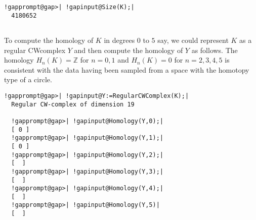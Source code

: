 \documentclass[a4paper,11pt]{report}
\begin{document}
{{\begin{Verbatim}[commandchars=!@|,fontsize=\small,frame=single,label=Example]
  !gapprompt@gap>| !gapinput@Size(K);|
  4180652
  
\end{Verbatim}
 

To compute the homology of $K$ in degrees $0$ to $5$ say, we could represent $K$ as a regular CW\texttt{}complex $Y$ and then compute the homology of $Y$ as follows. The homology $H_n(K)=\mathbb Z$ for $n=0,1$ and $H_n(K)= 0$ for $n=2,3,4,5$ is consistent with the data having been sampled from a space with the homotopy
type of a circle. 
\begin{Verbatim}[commandchars=!@|,fontsize=\small,frame=single,label=Example]
  !gapprompt@gap>| !gapinput@Y:=RegularCWComplex(K);|
  Regular CW-complex of dimension 19
  
  !gapprompt@gap>| !gapinput@Homology(Y,0);|
  [ 0 ]
  !gapprompt@gap>| !gapinput@Homology(Y,1);|
  [ 0 ]
  !gapprompt@gap>| !gapinput@Homology(Y,2);|
  [  ]
  !gapprompt@gap>| !gapinput@Homology(Y,3);|
  [  ]
  !gapprompt@gap>| !gapinput@Homology(Y,4);|
  [  ]
  !gapprompt@gap>| !gapinput@Homology(Y,5)|
  [  ]
  
\end{Verbatim}
 }

 }

 
\end{document}
